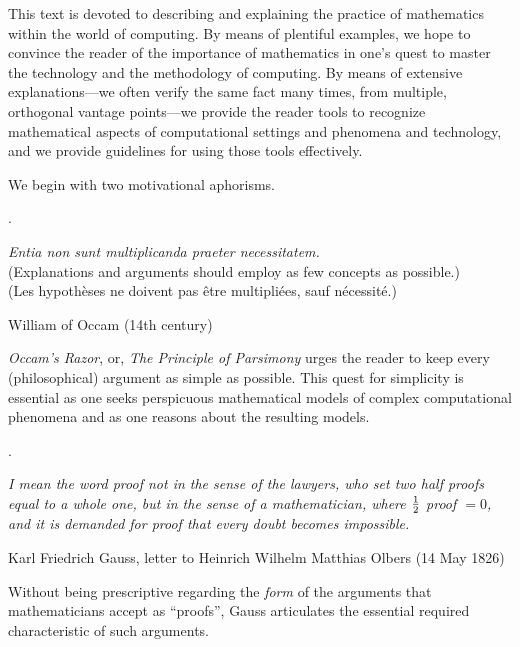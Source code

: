 \medskip

This text is devoted to describing and explaining the practice of mathematics within the world of computing.  By means of plentiful examples, we hope to convince the reader of the importance of mathematics in one's quest to master the technology and the methodology of computing.  By means of extensive explanations---we often verify the same fact many times, from multiple,
orthogonal vantage points---we provide the reader tools to recognize mathematical aspects of computational settings and phenomena and technology, and we provide guidelines for using those tools effectively.

\medskip

We begin with two motivational aphorisms.

\medskip

.


\noindent
{\it Entia non sunt multiplicanda praeter necessitatem.} \\
(Explanations and arguments should employ as few concepts as possible.) \\
(Les hypoth\`eses ne doivent pas \^etre multipli\' ees, sauf n\'ecessit\'e.)

\hfill {\small William of Occam (14th century)} 

\medskip

\noindent
{\it Occam's Razor}, or, {\it The Principle of Parsimony} urges the reader to keep every (philosophical) argument as simple as possible.  This quest for simplicity is essential as one seeks perspicuous mathematical models of complex computational phenomena and as one reasons about the resulting models.

\medskip

.

\noindent
{\it I mean the word proof not in the sense of the lawyers, who set two half proofs equal to a whole one, but in the sense of a mathematician, where ${1 \over 2}$ proof $= 0$, and it is demanded for proof that every doubt becomes impossible.}

\hfill {\small Karl Friedrich Gauss, letter to Heinrich Wilhelm Matthias Olbers (14 May 1826)}

\medskip

\noindent
Without being prescriptive regarding the {\em form} of the arguments that mathematicians accept as ``proofs'', Gauss articulates the essential required characteristic of such arguments.

